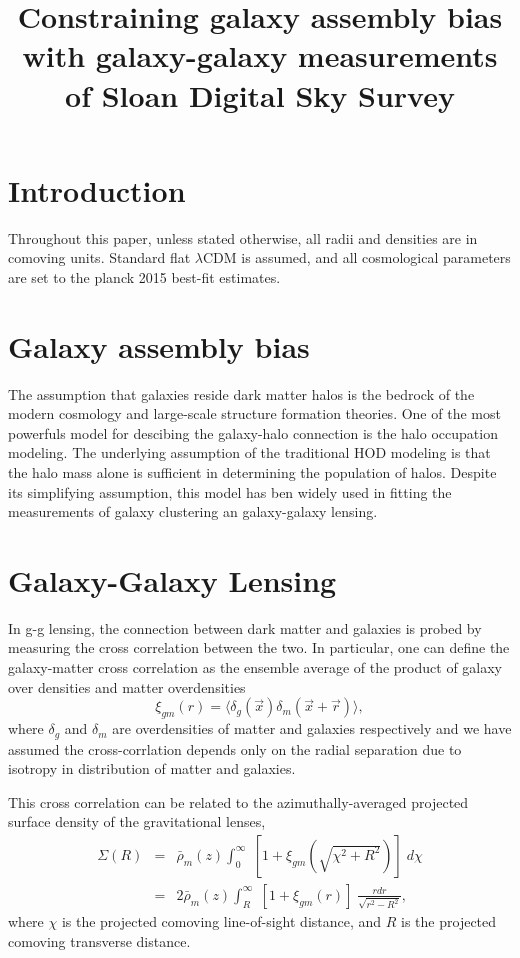 \documentclass[12pt, preprint]{aastex}
\newcommand{\beq}{\begin{equation}}
\newcommand{\eeq}{\end{equation}}
\begin{document}
\title{Constraining galaxy assembly bias with galaxy-galaxy measurements of Sloan Digital Sky Survey}

\begin{abstract}

\end{abstract}

\section{Introduction}

Throughout this paper, unless stated otherwise, all radii and densities are in comoving units.
Standard flat $\lambda$CDM is assumed, and all cosmological parameters are set to the planck 
2015 best-fit estimates.

\section{Galaxy assembly bias}

The assumption that galaxies reside dark matter halos is the bedrock of the modern cosmology and 
large-scale structure formation theories. One of the most powerfuls model for descibing the galaxy-halo 
connection is the halo occupation modeling. The underlying assumption of the traditional HOD modeling is 
that the halo mass alone is sufficient in determining the population of halos. Despite its simplifying 
assumption, this model has ben widely used in fitting the measurements of galaxy clustering an galaxy-galaxy lensing.

\section{Galaxy-Galaxy Lensing}

In g-g lensing, the connection between dark matter and galaxies is probed by measuring 
the cross correlation between the two. In particular, one can define the galaxy-matter cross correlation 
as the ensemble average of the product of galaxy over densities and matter overdensities
\beq
\xi_{gm}(r) = \langle \delta_{g}(\vec{x}) \delta_{m}(\vec{x}+\vec{r}) \rangle,
\eeq
where $\delta_g$ and $\delta_m$ are overdensities of matter and galaxies respectively and we have 
assumed the cross-corrlation depends only on the radial separation due to isotropy in distribution of matter
and galaxies.

This cross correlation can be related to the azimuthally-averaged  projected surface density of the gravitational
lenses,
\begin{eqnarray}
\Sigma(R) &=& \bar{\rho}_{m}(z)\int_{0}^{\infty} \;  [1 + \xi_{gm}(\sqrt{\chi^2 + R^2})] \; d\chi \nonumber \\
          &=& 2\bar{\rho}_{m}(z)\int_{R}^{\infty} \; [1 + \xi_{gm}(r)] \; \frac{rdr}{\sqrt{r^{2} - R^{2}}},
\end{eqnarray}
where $\chi$ is the projected comoving line-of-sight distance, and $R$ is the projected comoving transverse distance.
\end{document}
